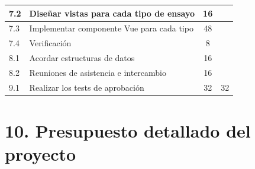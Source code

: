 \documentclass[11pt]{charter}
\begin{document}
\begin{table}[htpb]
\begin{tabular}{|l|l|c|c|}
7.2 & Diseñar vistas para cada tipo de ensayo & 16  &  \\ \hline
7.3 & Implementar componente Vue para cada tipo & 48  &  \\ \hline
7.4 & Verificación & 8  &  \\ \hline
8.1 & Acordar estructuras de datos & 16  &  \\ \hline
8.2 & Reuniones de asistencia e intercambio & 16  &  \\ \hline
9.1 & Realizar los tests de aprobación & 32  & 32 \\ \hline
\end{tabular}
\end{table}


\section{10. Presupuesto detallado del proyecto}
\label{sec:presupuesto}

\end{document}

